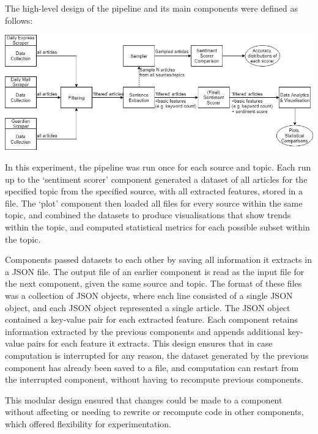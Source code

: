 \documentclass{report}
\begin{document}
The high-level design of the pipeline and its main components were defined as follows:

\vspace{0.5em}
\noindent
\includegraphics[width=\textwidth]{overall-design2.png}

In this experiment, the pipeline was run once for each source and topic.
Each run up to the `sentiment scorer' component generated a dataset of all articles for the specified topic from the specified source, with all extracted features, stored in a file.
The `plot' component then loaded all files for every source within the same topic, and combined the datasets to produce visualisations that show trends within the topic, and computed statistical metrics for each possible subset within the topic.

Components passed datasets to each other by saving all information it extracts in a JSON file.
The output file of an earlier component is read as the input file for the next component, given the same source and topic.
The format of these files was a collection of JSON objects, where each line consisted of a single JSON object, and each JSON object represented a single article.
The JSON object contained a key-value pair for each extracted feature.
Each component retains information extracted by the previous components and appends additional key-value pairs for each feature it extracts.
This design ensures that in case computation is interrupted for any reason, the dataset generated by the previous component has already been saved to a file, and computation can restart from the interrupted component, without having to recompute previous components.

This modular design ensured that changes could be made to a component without affecting or needing to rewrite or recompute code in other components, which offered flexibility for experimentation.
\end{document}
